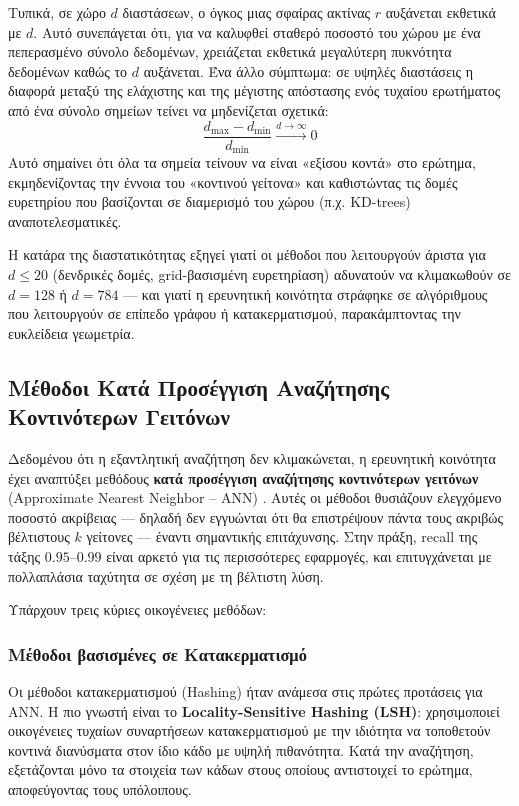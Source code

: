\documentclass[12pt,a4paper]{article}
\begin{document}
Τυπικά, σε χώρο $d$ διαστάσεων, ο όγκος μιας σφαίρας ακτίνας $r$ αυξάνεται εκθετικά με $d$. Αυτό συνεπάγεται ότι, για να καλυφθεί σταθερό ποσοστό του χώρου με ένα πεπερασμένο σύνολο δεδομένων, χρειάζεται εκθετικά μεγαλύτερη πυκνότητα δεδομένων καθώς το $d$ αυξάνεται. Ένα άλλο σύμπτωμα: σε υψηλές διαστάσεις η διαφορά μεταξύ της ελάχιστης και της μέγιστης απόστασης ενός τυχαίου ερωτήματος από ένα σύνολο σημείων τείνει να μηδενίζεται σχετικά:
\[
\frac{d_{\max} - d_{\min}}{d_{\min}} \xrightarrow{d \to \infty} 0
\]
Αυτό σημαίνει ότι όλα τα σημεία τείνουν να είναι «εξίσου κοντά» στο ερώτημα, εκμηδενίζοντας την έννοια του «κοντινού γείτονα» και καθιστώντας τις δομές ευρετηρίου που βασίζονται σε διαμερισμό του χώρου (π.χ. KD-trees) αναποτελεσματικές.

Η κατάρα της διαστατικότητας εξηγεί γιατί οι μέθοδοι που λειτουργούν άριστα για $d \leq 20$ (δενδρικές δομές, grid-βασισμένη ευρετηρίαση) αδυνατούν να κλιμακωθούν σε $d = 128$ ή $d = 784$ --- και γιατί η ερευνητική κοινότητα στράφηκε σε αλγόριθμους που λειτουργούν σε επίπεδο γράφου ή κατακερματισμού, παρακάμπτοντας την ευκλείδεια γεωμετρία.

\subsection{Μέθοδοι Κατά Προσέγγιση Αναζήτησης Κοντινότερων Γειτόνων}

Δεδομένου ότι η εξαντλητική αναζήτηση δεν κλιμακώνεται, η ερευνητική κοινότητα έχει αναπτύξει μεθόδους \textbf{κατά προσέγγιση αναζήτησης κοντινότερων γειτόνων} (Approximate Nearest Neighbor -- ANN) \cite{nns_survey}. Αυτές οι μέθοδοι θυσιάζουν ελεγχόμενο ποσοστό ακρίβειας --- δηλαδή δεν εγγυώνται ότι θα επιστρέψουν πάντα τους ακριβώς βέλτιστους $k$ γείτονες --- έναντι σημαντικής επιτάχυνσης. Στην πράξη, recall της τάξης $0.95$--$0.99$ είναι αρκετό για τις περισσότερες εφαρμογές, και επιτυγχάνεται με πολλαπλάσια ταχύτητα σε σχέση με τη βέλτιστη λύση.

Υπάρχουν τρεις κύριες οικογένειες μεθόδων:

\subsubsection{Μέθοδοι βασισμένες σε Κατακερματισμό}

Οι μέθοδοι κατακερματισμού (Hashing) ήταν ανάμεσα στις πρώτες προτάσεις για ANN. Η πιο γνωστή είναι το \textbf{Locality-Sensitive Hashing (LSH)}: χρησιμοποιεί οικογένειες τυχαίων συναρτήσεων κατακερματισμού με την ιδιότητα να τοποθετούν κοντινά διανύσματα στον ίδιο κάδο με υψηλή πιθανότητα. Κατά την αναζήτηση, εξετάζονται μόνο τα στοιχεία των κάδων στους οποίους αντιστοιχεί το ερώτημα, αποφεύγοντας τους υπόλοιπους.
\end{document}
